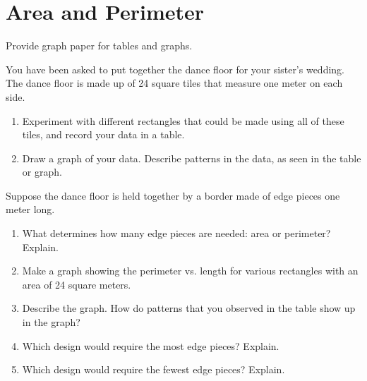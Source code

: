 \newpage

\section{Area and Perimeter}
\begin{teachingnote}
Provide graph paper for tables and graphs.  
\end{teachingnote}



\begin{prob} You have been asked to put together the dance floor for your sister's wedding.  The dance floor is made up of 24 square tiles that measure one meter on each side. 
\begin{enumerate}
\item Experiment with different rectangles that could be made using all of these tiles, and record your data in a table.  
\item Draw a graph of your data.  Describe patterns in the data, as seen in the table or graph.  
\end{enumerate}
\end{prob}

\begin{prob} Suppose the dance floor is held together by a border made of edge pieces one meter long.  
\begin{enumerate}
\item What determines how many edge pieces are needed: area or perimeter?  Explain. 
\item Make a graph showing the perimeter vs. length for various rectangles with an area of 24 square meters.  
\item Describe the graph.  How do patterns that you observed in the table show up in the graph?  
\item Which design would require the most edge pieces?  Explain.  
\item Which design would require the fewest edge pieces?  Explain.
\end{enumerate}
\end{prob}

